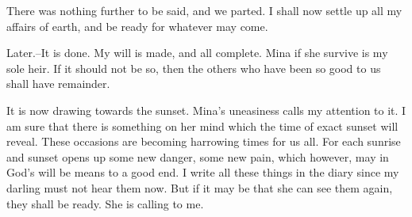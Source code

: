 There was nothing further to be said, and we parted. I shall now settle up all my affairs of earth, and be ready for whatever may come. 

Later.--It is done. My will is made, and all complete. Mina if she survive is my sole heir. If it should not be so, then the others who have been so good to us shall have remainder. 

It is now drawing towards the sunset. Mina's uneasiness calls my attention to it. I am sure that there is something on her mind which the time of exact sunset will reveal. These occasions are becoming harrowing times for us all. For each sunrise and sunset opens up some new danger, some new pain, which however, may in God's will be means to a good end. I write all these things in the diary since my darling must not hear them now. But if it may be that she can see them again, they shall be ready. She is calling to me. 
